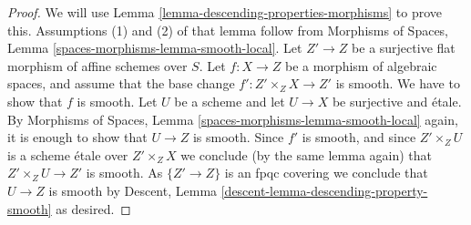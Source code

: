 \documentclass[10pt,a4paper]{amsart}
\theoremstyle{plain}
\theoremstyle{definition}
\theoremstyle{remark}
\numberwithin{equation}{subsection}
\begin{document}
\begin{proof}
We will use
Lemma \ref{lemma-descending-properties-morphisms}
to prove this. Assumptions (1) and (2) of that lemma follow from
Morphisms of Spaces,
Lemma \ref{spaces-morphisms-lemma-smooth-local}.
Let $Z' \to Z$ be a surjective flat morphism of affine schemes over $S$.
Let $f : X \to Z$ be a morphism of algebraic spaces, and assume
that the base change $f' : Z' \times_Z X \to Z'$ is smooth.
We have to show that $f$ is smooth. Let $U$ be a scheme
and let $U \to X$ be surjective and \'etale. By
Morphisms of Spaces,
Lemma \ref{spaces-morphisms-lemma-smooth-local}
again, it is enough to show that $U \to Z$ is smooth.
Since $f'$ is smooth, and since $Z' \times_Z U$ is a
scheme \'etale over $Z' \times_Z X$ we conclude (by the same lemma again) that
$Z' \times_Z U \to Z'$ is smooth.
As $\{Z' \to Z\}$ is an fpqc covering we conclude that
$U \to Z$ is smooth by
Descent, Lemma \ref{descent-lemma-descending-property-smooth}
as desired.
\end{proof}
\end{document}
